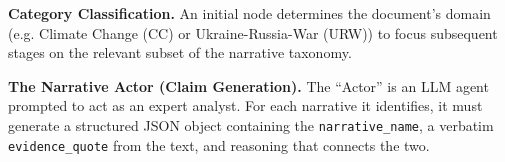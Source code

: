 \textbf{Category Classification.} 
An initial node determines the document's domain (e.g. Climate Change (CC) or Ukraine-Russia-War (URW)) to focus subsequent stages on the relevant subset of the narrative taxonomy.

\textbf{The Narrative Actor (Claim Generation).}
The ``Actor'' is an LLM agent prompted to act as an expert analyst. For each narrative it identifies, it must generate a structured JSON object containing the \texttt{narrative\_name}, a verbatim \texttt{evidence\_quote} from the text, and reasoning that connects the two.

